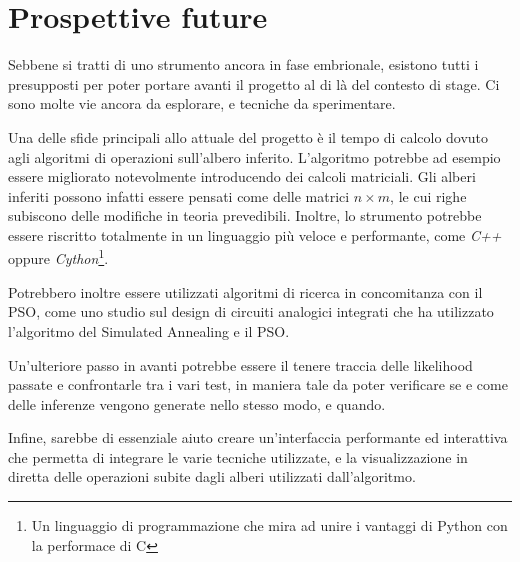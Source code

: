 \chapter{Prospettive future}
\label{chap:future}
Sebbene si tratti di uno strumento ancora in fase embrionale, esistono tutti i presupposti per poter portare avanti il progetto al di là del contesto di stage. Ci sono molte vie ancora da esplorare, e tecniche da sperimentare.

Una delle sfide principali allo attuale del progetto è il tempo di calcolo dovuto agli algoritmi di operazioni sull'albero inferito. L'algoritmo potrebbe ad esempio essere migliorato notevolmente introducendo dei calcoli matriciali. Gli alberi inferiti possono infatti essere pensati come delle matrici $n \times m$, le cui righe subiscono delle modifiche in teoria prevedibili. Inoltre, lo strumento potrebbe essere riscritto totalmente in un linguaggio più veloce e performante, come \textit{C++} oppure \textit{Cython}\footnote{Un linguaggio di programmazione che mira ad unire i vantaggi di Python con la performace di C}.

Potrebbero inoltre essere utilizzati algoritmi di ricerca in concomitanza con il PSO, come uno studio sul design di circuiti analogici integrati \cite{designanalogsapso} che ha utilizzato l'algoritmo del Simulated Annealing e il PSO.

Un'ulteriore passo in avanti potrebbe essere il tenere traccia delle likelihood passate e confrontarle tra i vari test, in maniera tale da poter verificare se e come delle inferenze vengono generate nello stesso modo, e quando.

Infine, sarebbe di essenziale aiuto creare un'interfaccia performante ed interattiva che permetta di integrare le varie tecniche utilizzate, e la visualizzazione in diretta delle operazioni subite dagli alberi utilizzati dall'algoritmo.